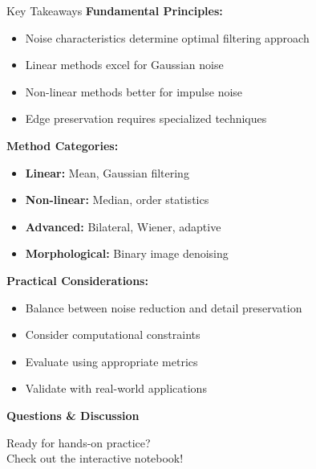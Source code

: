 \documentclass[aspectratio=169,10pt]{beamer}
\begin{document}
\begin{frame}{Key Takeaways}
\textbf{Fundamental Principles:}
\begin{itemize}
\item Noise characteristics determine optimal filtering approach
\item Linear methods excel for Gaussian noise
\item Non-linear methods better for impulse noise
\item Edge preservation requires specialized techniques
\end{itemize}

\textbf{Method Categories:}
\begin{itemize}
\item \textbf{Linear:} Mean, Gaussian filtering
\item \textbf{Non-linear:} Median, order statistics
\item \textbf{Advanced:} Bilateral, Wiener, adaptive
\item \textbf{Morphological:} Binary image denoising
\end{itemize}

\textbf{Practical Considerations:}
\begin{itemize}
\item Balance between noise reduction and detail preservation
\item Consider computational constraints
\item Evaluate using appropriate metrics
\item Validate with real-world applications
\end{itemize}
\end{frame}

\begin{frame}[standout]
\Large
\textbf{Questions \& Discussion}

\vspace{1cm}
\normalsize
Ready for hands-on practice?\\
Check out the interactive notebook!
\end{frame}
\end{document}
